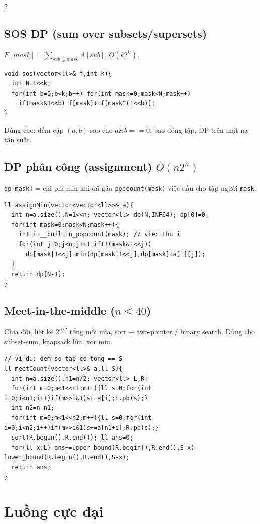 \documentclass[8pt]{extarticle}
\begin{document}
\begin{multicols}{2}
\subsection{SOS DP (sum over subsets/supersets)}
$F[mask]=\sum_{sub\subseteq mask} A[sub]$. $O(k2^k)$.
\begin{lstlisting}
void sos(vector<ll>& f,int k){
  int N=1<<k;
  for(int b=0;b<k;b++) for(int mask=0;mask<N;mask++)
    if(mask&1<<b) f[mask]+=f[mask^(1<<b)];
}
\end{lstlisting}
Dùng cho: đếm cặp $(a,b)$ sao cho $a\&b==0$, bao đóng tập, DP trên mặt nạ tần suất.

\subsection{DP phân công (assignment) $O(n2^n)$}
\texttt{dp[mask]} = chi phí min khi đã gán \texttt{popcount(mask)} việc đầu cho tập người \texttt{mask}.
\begin{lstlisting}
ll assignMin(vector<vector<ll>>& a){
  int n=a.size(),N=1<<n; vector<ll> dp(N,INF64); dp[0]=0;
  for(int mask=0;mask<N;mask++){
    int i=__builtin_popcount(mask); // viec thu i
    for(int j=0;j<n;j++) if(!(mask&1<<j))
      dp[mask|1<<j]=min(dp[mask|1<<j],dp[mask]+a[i][j]);
  }
  return dp[N-1];
}
\end{lstlisting}

\subsection{Meet-in-the-middle ($n\le 40$)}
Chia đôi, liệt kê $2^{n/2}$ tổng mỗi nửa, sort + two-pointer / binary search. Dùng cho subset-sum, knapsack lớn, xor min.
\begin{lstlisting}
// vi du: dem so tap co tong == S
ll meetCount(vector<ll>& a,ll S){
  int n=a.size(),n1=n/2; vector<ll> L,R;
  for(int m=0;m<1<<n1;m++){ll s=0;for(int i=0;i<n1;i++)if(m>>i&1)s+=a[i];L.pb(s);}
  int n2=n-n1;
  for(int m=0;m<1<<n2;m++){ll s=0;for(int i=0;i<n2;i++)if(m>>i&1)s+=a[n1+i];R.pb(s);}
  sort(R.begin(),R.end()); ll ans=0;
  for(ll x:L) ans+=upper_bound(R.begin(),R.end(),S-x)-lower_bound(R.begin(),R.end(),S-x);
  return ans;
}
\end{lstlisting}

\section{Luồng cực đại}

\end{multicols}
\end{document}

